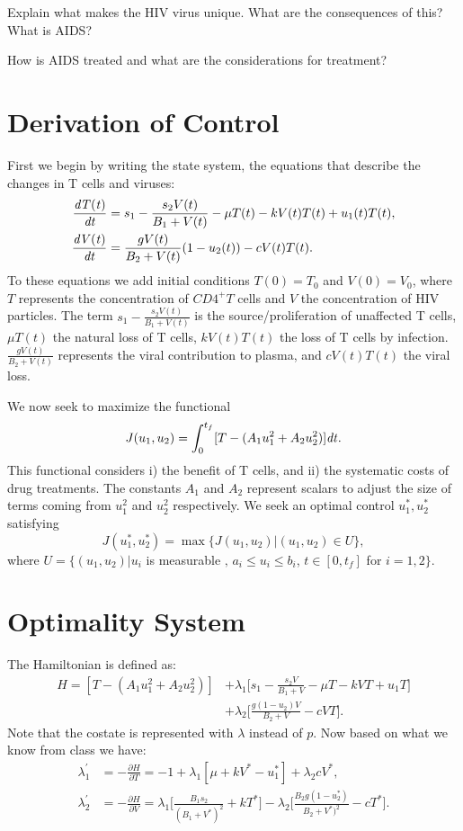 \begin{problem}
Explain what makes the HIV virus unique. What are the consequences of this? What is AIDS?
\label{problem:hiv:virusunderstanding}
\end{problem}

\begin{problem}
How is AIDS treated and what are the considerations for treatment?
\label{problem:hiv:treatment}
\end{problem}

\section*{Derivation of Control}
First we begin by writing the state system, the equations that describe the changes in T cells and viruses:
\begin{align*}
\frac{\it{d}T(t)}{\it{dt}} &= s_1 - \frac{s_2V(t)}{B_1+V(t)} - \mu T(t)-kV(t)T(t)+u_1(t)T(t), \\
\frac{\it{d}V(t)}{\it{dt}} &= \frac{gV(t)}{B_2+V(t)}(1-u_2(t)) - cV(t)T(t).
\end{align*}
To these equations we add initial conditions $T(0)=T_0$ and $V(0)=V_0$, where $T$ represents the concentration of $CD4^+T$ cells and $V$ the concentration of HIV particles. 
The term $s_1-\frac{s_2V(t)}{B_1+V(t)}$ is the source/proliferation of unaffected T cells,
$\mu T(t)$ the natural loss of T cells, $kV(t)T(t)$ the loss of T cells by infection. 
$\frac{gV(t)}{B_2+V(t)}$ represents the viral contribution to plasma, and $cV(t)T(t)$ the viral loss.

We now seek to maximize the functional 
\[
J(u_1,u_2) = \int_0^{t_f}[T-(A_1u_1^2+A_2u_2^2)]\it{dt}.
\]
This functional considers i) the benefit of T cells, and ii) the systematic costs of drug treatments.
The constants $A_1$ and $A_2$ represent scalars to adjust the size of terms coming from $u_1^2$ and $u_2^2$ respectively. 
We seek an optimal control $u_1^*,u_2^*$ satisfying
\[
J(u_1^*,u_2^*)=\max\{J(u_1,u_2)|(u_1,u_2)\in U\},
\]
where $U=\{(u_1,u_2)|u_i $ is measurable $,\,a_i\le u_i \le b_i$, $t\in[0,t_f]$ for $i=1,2\}$.
 
\section*{Optimality System}
The Hamiltonian is defined as:
\begin{align*}
	H = [T-(A_1u_1^2+A_2u_2^2)]&+\lambda_1\Big[ s_1 - \frac{s_2V}{B_1+V}-\mu T-kVT+u_1T \Big] \\
	&+ \lambda_2 \Big[\frac{g(1-u_2)V}{B_2+V}-cVT\Big].
\end{align*}
Note that the costate is represented with $\lambda$ instead of $p$. Now based on what we know from class we have:
\begin{align*}
\lambda_1^{'} &=-\frac{\partial H}{\partial T} =  -1+\lambda_1[\mu+kV^*-u_1^*]+\lambda_2cV^*,\\
\lambda_2^{'} &= -\frac{\partial H}{\partial V} = \lambda_1\Big[\frac{B_1s_2}{(B_1+V^*)^2}+kT^*\Big] -\lambda_2\Big[\frac{B_2g(1-u_2^*)}{B_2+V^*)^2}-cT^*\Big].
\end{align*}

